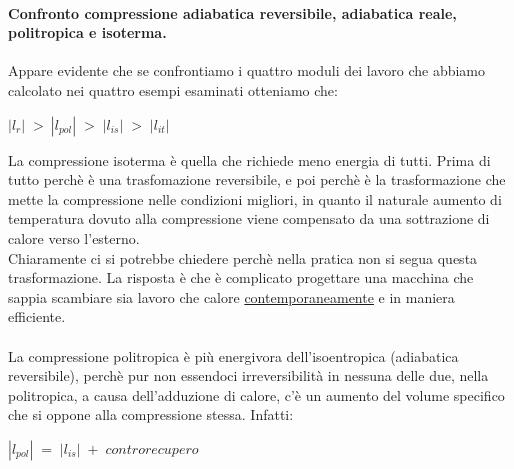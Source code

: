 \documentclass[a4paper, twoside, 12pt]{report}
\begin{document}
\paragraph{Confronto compressione adiabatica reversibile, adiabatica reale, politropica e isoterma.\\}
Appare evidente che se confrontiamo i quattro moduli dei lavoro che abbiamo calcolato nei quattro esempi esaminati otteniamo che:
\begin{center}
	$|l_{r}|\;>\:|l_{pol}|\;>\;|l_{is}|\;>\;|l_{it}|$
\end{center}
La compressione isoterma è quella che richiede meno energia di tutti. Prima di tutto perchè è una trasfomazione reversibile, e poi perchè è la trasformazione che mette la compressione nelle condizioni migliori, in quanto il naturale aumento di temperatura dovuto alla compressione viene compensato da una sottrazione di calore verso l'esterno.\\
Chiaramente ci si potrebbe chiedere perchè nella pratica non si segua questa trasformazione. La risposta è che è complicato progettare una macchina che sappia scambiare sia lavoro che calore \uline{contemporaneamente} e in maniera efficiente.\\
\\
La compressione politropica è più energivora dell'isoentropica (adiabatica reversibile), perchè pur non essendoci irreversibilità in nessuna delle due, nella politropica, a causa dell'adduzione di calore, c'è un aumento del volume specifico che si oppone alla compressione stessa. Infatti:
\begin{center}
	$|l_{pol}|\;=\;|l_{is}|\;+\;controrecupero$
\end{center}
\end{document}
